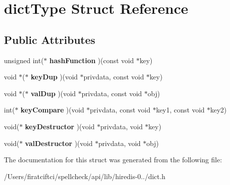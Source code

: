 \hypertarget{structdict_type}{}\section{dict\+Type Struct Reference}
\label{structdict_type}
\subsection*{Public Attributes}
\begin{DoxyCompactItemize}
\item 
\mbox{\label{structdict_type_a43524fbcaf549cd2eaae4caf67b03a46}} 
unsigned int($\ast$ {\bfseries hash\+Function} )(const void $\ast$key)
\item 
\mbox{\label{structdict_type_a9addb7c29c6082073a17743b44b0d563}} 
void $\ast$($\ast$ {\bfseries key\+Dup} )(void $\ast$privdata, const void $\ast$key)
\item 
\mbox{\label{structdict_type_ad9752f0251c3121b2fc96be02383eee2}} 
void $\ast$($\ast$ {\bfseries val\+Dup} )(void $\ast$privdata, const void $\ast$obj)
\item 
\mbox{\label{structdict_type_abc4e87fe80173aa50732c049d3be96b5}} 
int($\ast$ {\bfseries key\+Compare} )(void $\ast$privdata, const void $\ast$key1, const void $\ast$key2)
\item 
\mbox{\label{structdict_type_a448ee05f531f872a05a2cdafccb5ecc4}} 
void($\ast$ {\bfseries key\+Destructor} )(void $\ast$privdata, void $\ast$key)
\item 
\mbox{\label{structdict_type_a491b1283bac257f1573e38479131b18f}} 
void($\ast$ {\bfseries val\+Destructor} )(void $\ast$privdata, void $\ast$obj)
\end{DoxyCompactItemize}


The documentation for this struct was generated from the following file\+:\begin{DoxyCompactItemize}
\item 
/\+Users/firatciftci/spellcheck/api/lib/hiredis-\/0../dict.\+h\end{DoxyCompactItemize}
